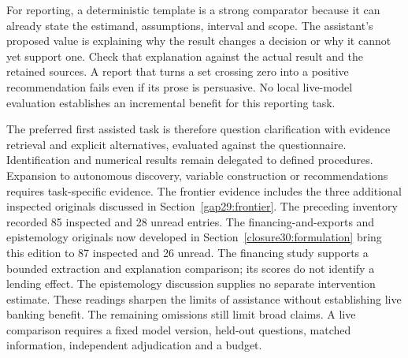 For reporting, a deterministic template is a strong comparator because
it can already state the estimand, assumptions, interval and scope.
The assistant's proposed value is explaining why the result changes a
decision or why it cannot yet support one. Check that explanation
against the actual result and the retained sources. A report that turns
a set crossing zero into a positive recommendation fails even if its
prose is persuasive. No local live-model evaluation establishes an
incremental benefit for this reporting task.

The preferred first assisted task is therefore question clarification
with evidence retrieval and explicit alternatives, evaluated against
the questionnaire. Identification and numerical results remain delegated
to defined procedures. Expansion to autonomous discovery, variable
construction or recommendations requires task-specific evidence. The
frontier evidence includes the three additional inspected originals discussed
in Section~\ref{gap29:frontier}. The preceding inventory recorded 85 inspected
and 28 unread entries. The financing-and-exports and epistemology originals
now developed in Section~\ref{closure30:formulation} bring this edition to
87 inspected and 26 unread. The financing study supports a bounded extraction
and explanation comparison; its scores do not identify a lending effect.
The epistemology discussion supplies no separate intervention estimate. These
readings sharpen the limits of assistance without establishing live banking
benefit. The remaining omissions still limit broad claims. A live comparison
requires a fixed model version, held-out questions, matched information,
independent adjudication and a budget.~\citep{rel18li,rel18mugleston}


